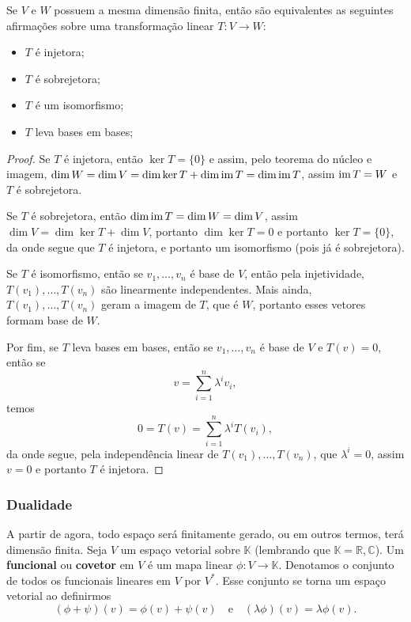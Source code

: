 \begin{proposition}\label{prop12}
    Se $V$ e $W$ possuem a mesma dimensão finita, então são equivalentes as seguintes afirmações sobre uma transformação linear $T \colon V \to W$: \begin{itemize}
        \item $T$ é injetora;
        \item $T$ é sobrejetora;
        \item $T$ é um isomorfismo;
        \item $T$ leva bases em bases;
    \end{itemize}
\end{proposition}
\begin{proof}
    Se $T$ é injetora, então $\ker T = \{0\}$ e assim, pelo teorema do núcleo e imagem, $\dim W = \dim V = \dim \ker T + \dim \operatorname{im} T = \dim \operatorname{im} T$, assim $\operatorname{im} T = W$ e $T$ é sobrejetora.

    Se $T$ é sobrejetora, então $\dim \operatorname{im} T = \dim W = \dim V$, assim $\dim V = \dim \ker T + \dim V$, portanto $\dim \ker T = 0$ e portanto $\ker T = \{0\}$, da onde segue que $T$ é injetora, e portanto um isomorfismo (pois já é sobrejetora).

    Se $T$ é isomorfismo, então se $v_1, \dots, v_n$ é base de $V$, então pela injetividade, $T(v_1), \dots, T(v_n)$ são linearmente independentes. Mais ainda, $T(v_1), \dots, T(v_n)$ geram a imagem de $T$, que é $W$, portanto esses vetores formam base de $W$.

    Por fim, se $T$ leva bases em bases, então se $v_1, \dots, v_n$ é base de $V$ e $T(v) = 0$, então se \begin{equation}
        v = \sum_{i = 1}^n \lambda^i v_i,
    \end{equation} temos \begin{equation}
        0 = T(v) = \sum_{i = 1}^n \lambda^i T(v_i),
    \end{equation} da onde segue, pela independência linear de $T(v_1), \dots, T(v_n)$, que $\lambda^i = 0$, assim $v = 0$ e portanto $T$ é injetora.
\end{proof}

\subsubsection*{Dualidade}

A partir de agora, todo espaço será finitamente gerado, ou em outros termos, terá dimensão finita. Seja $V$ um espaço vetorial sobre $\mathbb{K}$ (lembrando que $\mathbb{K} = \mathbb{R}, \mathbb{C}$). Um \textbf{funcional} ou \textbf{covetor} em $V$ é um mapa linear $\phi \colon V \to \mathbb{K}$. Denotamos o conjunto de todos os funcionais lineares em $V$ por $V^*$. Esse conjunto se torna um espaço vetorial ao definirmos \begin{equation}
    (\phi + \psi)(v) = \phi(v) + \psi(v) \quad \text{e} \quad (\lambda \phi)(v) = \lambda \phi(v).
\end{equation}

